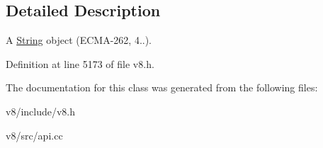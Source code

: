 \subsection{Detailed Description}
A \mbox{\hyperlink{classv8_1_1String}{String}} object (E\+C\+M\+A-\/262, 4..). 

Definition at line 5173 of file v8.\+h.



The documentation for this class was generated from the following files\+:\begin{DoxyCompactItemize}
\item 
v8/include/v8.\+h\item 
v8/src/api.\+cc\end{DoxyCompactItemize}
